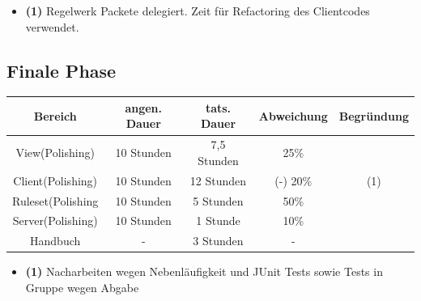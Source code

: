 \documentclass{article}
\begin{document}
\begin{itemize}
\item \textbf{(1)} Regelwerk Packete delegiert. Zeit für Refactoring des Clientcodes verwendet. \\
\end{itemize}

\subsection{Finale Phase}
\begin{tabular}{|c|c|c|c|c|}\hline
   Bereich & angen. Dauer & tats. Dauer & Abweichung & Begründung\\ \hline\hline
   View(Polishing) & 10 Stunden & 7,5 Stunden & 25\% &\\ \hline
   Client(Polishing) & 10 Stunden & 12 Stunden & (-) 20\% & (1) \\ \hline
   Ruleset(Polishing & 10 Stunden & 5 Stunden & 50\% &\\ \hline
   Server(Polishing) & 10 Stunden & 1 Stunde & 10\% &\\ \hline
 Handbuch & - & 3 Stunden & - &\\ \hline
\end{tabular}
 
\begin{itemize}
\item \textbf{(1)} Nacharbeiten wegen Nebenläufigkeit und JUnit Tests sowie Tests in Gruppe wegen Abgabe\\
\end{itemize}
\end{document}
